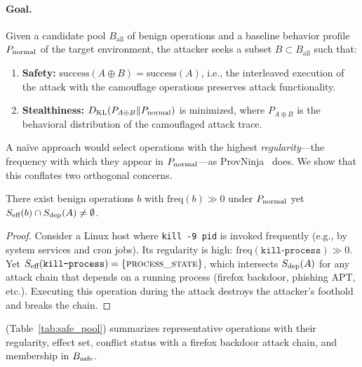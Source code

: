 \paragraph{Goal.}
Given a candidate pool $B_{\text{all}}$ of benign operations and a
baseline behavior profile $P_{\text{normal}}$ of the target environment, the
attacker seeks a subset $B \subset B_{\text{all}}$ such that:
\begin{enumerate}
  \item \textbf{Safety:} $\mathrm{success}(A \oplus B) = \mathrm{success}(A)$,
        i.e., the interleaved execution of the attack with the camouflage
        operations preserves attack functionality.
  \item \textbf{Stealthiness:}
        $D_{\text{KL}}(P_{A \oplus B} \| P_{\text{normal}})$ is minimized, where
        $P_{A \oplus B}$ is the behavioral distribution of the
        camouflaged attack trace.
\end{enumerate}

A na\"ive approach would select operations with the highest
\emph{regularity}---the frequency with which they appear in
$P_{\text{normal}}$---as ProvNinja~\cite{provninja} does. We show that this
conflates two orthogonal concerns.

\begin{proposition}
\label{prop:regularity}
There exist benign operations $b$ with $\mathrm{freq}(b) \gg 0$ under
$P_{\text{normal}}$ yet $S_{\text{eff}}(b) \cap S_{\text{dep}}(A) \neq \emptyset$.
\end{proposition}

\begin{proof}
Consider a Linux host where \texttt{kill -9 \textlangle pid\textrangle} is
invoked frequently (e.g., by system services and cron jobs). Its regularity is
high: $\mathrm{freq}(\texttt{kill-process}) \gg 0$. Yet
$S_{\text{eff}}(\texttt{kill-process}) = \{\textsc{process\_state}\}$, which
intersects $S_{\text{dep}}(A)$ for any attack chain that depends on a running process
(firefox backdoor, phishing APT, etc.). Executing this operation
during the attack destroys the attacker's foothold and breaks the chain.
\end{proof}

 (Table~\ref{tab:safe_pool}) summarizes representative
operations with their regularity, effect set, conflict status with a
firefox backdoor attack chain, and membership in $B_{\text{safe}}$.

